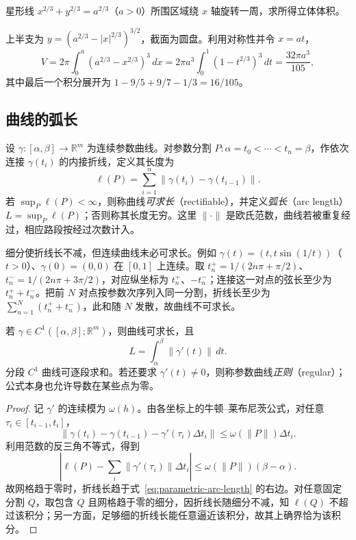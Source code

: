 \begin{example}
\label{ex:astroid-solid-volume}
星形线 $x^{2/3}+y^{2/3}=a^{2/3}$（$a>0$）所围区域绕 $x$ 轴旋转一周，求所得立体体积。
\end{example}
\begin{solve}
上半支为 $y=(a^{2/3}-|x|^{2/3})^{3/2}$，截面为圆盘。利用对称性并令 $x=at$，
\[
    V=2\pi\int_0^a(a^{2/3}-x^{2/3})^3\,dx
    =2\pi a^3\int_0^1(1-t^{2/3})^3\,dt
    =\frac{32\pi a^3}{105},
\]
其中最后一个积分展开为 $1-9/5+9/7-1/3=16/105$。
\end{solve}

\subsection{曲线的弧长}
\label{subsec:arc-length-of-curves}

\begin{definition}
\label{def:rectifiable-curve-length}
设 $\gamma:[\alpha,\beta]\to\mathbb R^m$ 为连续参数曲线。对参数分割 $P:\alpha=t_0<\cdots<t_n=\beta$，作依次连接 $\gamma(t_i)$ 的内接折线，定义其长度为
\[
    \ell(P)=\sum_{i=1}^n\|\gamma(t_i)-\gamma(t_{i-1})\|.
\]
若 $\sup_P\ell(P)<\infty$，则称曲线\emph{可求长}（rectifiable），并定义\emph{弧长}（arc length）$L=\sup_P\ell(P)$；否则称其长度无穷。这里 $\|\cdot\|$ 是欧氏范数，曲线若被重复经过，相应路段按经过次数计入。
\end{definition}

细分使折线长不减，但连续曲线未必可求长。例如 $\gamma(t)=(t,t\sin(1/t))$（$t>0$）、$\gamma(0)=(0,0)$ 在 $[0,1]$ 上连续。取 $t_n^+=1/(2n\pi+\pi/2)$、$t_n^-=1/(2n\pi+3\pi/2)$，对应纵坐标为 $t_n^+$、$-t_n^-$；连接这一对点的弦长至少为 $t_n^++t_n^-$。把前 $N$ 对点按参数次序列入同一分割，折线长至少为 $\sum_{n=1}^N(t_n^++t_n^-)$，此和随 $N$ 发散，故曲线不可求长。

\begin{theorem}[弧长积分公式]
\label{thm:arc-length-integral}
若 $\gamma\in C^1([\alpha,\beta];\mathbb R^m)$，则曲线可求长，且
\begin{equation}
    L=\int_\alpha^\beta\|\gamma'(t)\|\,dt.
    \label{eq:parametric-arc-length}
\end{equation}
分段 $C^1$ 曲线可逐段求和。若还要求 $\gamma'(t)\neq0$，则称参数曲线\emph{正则}（regular）；公式本身也允许导数在某些点为零。
\end{theorem}
\begin{proof}
记 $\gamma'$ 的连续模为 $\omega(h)$。由各坐标上的牛顿--莱布尼茨公式，对任意 $\tau_i\in[t_{i-1},t_i]$，
\[
    \|\gamma(t_i)-\gamma(t_{i-1})-\gamma'(\tau_i)\Delta t_i\|
    \leq\omega(\|P\|)\Delta t_i.
\]
利用范数的反三角不等式，得到
\[
    \left|\ell(P)-\sum_i\|\gamma'(\tau_i)\|\Delta t_i\right|
    \leq\omega(\|P\|)(\beta-\alpha).
\]
故网格趋于零时，折线长趋于式~\eqref{eq:parametric-arc-length} 的右边。对任意固定分割 $Q$，取包含 $Q$ 且网格趋于零的细分，因折线长随细分不减，知 $\ell(Q)$ 不超过该积分；另一方面，足够细的折线长能任意逼近该积分，故其上确界恰为该积分。
\end{proof}

